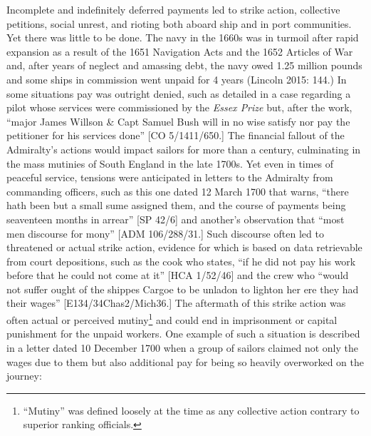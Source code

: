 \documentclass[12pt]{article}
\newenvironment{styleStandard}{\renewcommand\baselinestretch{1.0}\setlength\leftskip{0cm}\setlength\rightskip{0cm plus 1fil}\setlength\parindent{0cm}\setlength\parfillskip{0pt plus 1fil}\setlength\parskip{0in plus 1pt}\writerlistparindent\writerlistleftskip\leavevmode\normalfont\normalsize\writerlistlabel\ignorespaces}{\unskip\vspace{0in plus 1pt}\par}
\newcommand\writerlistleftskip{}
\newcommand\writerlistparindent{}
\newcommand\writerlistlabel{}
\begin{document}
\begin{styleStandard}
Incomplete and indefinitely deferred payments led to strike action, collective petitions, social unrest, and rioting both aboard ship and in port communities. Yet there was little to be done. The navy in the 1660s was in turmoil after rapid expansion as a result of the 1651 Navigation Acts and the 1652 Articles of War and, after years of neglect and amassing debt, the navy owed 1.25 million pounds and some ships in commission went unpaid for 4 years (Lincoln 2015: 144.) In some situations pay was outright denied, such as detailed in a case regarding a pilot whose services were commissioned by the \textit{Essex Prize} but, after the work, “major James Willson \& Capt Samuel Bush will in no wise satisfy nor pay the petitioner for his services done” [CO 5/1411/650.] The financial fallout of the Admiralty’s actions would impact sailors for more than a century, culminating in the mass mutinies of South England in the late 1700s. Yet even in times of peaceful service, tensions were anticipated in letters to the Admiralty from commanding officers, such as this one dated 12 March 1700 that warns, “there hath been but a small sume assigned them, and the course of payments being seaventeen months in arrear” [SP 42/6] and another’s observation that “most men discourse for mony” [ADM 106/288/31.] Such discourse often led to threatened or actual strike action, evidence for which is based on data retrievable from court depositions, such as the cook who states, “if he did not pay his work before that he could not come at it” [HCA 1/52/46] and the crew who “would not suffer ought of the shippes Cargoe to be unladon to lighton her ere they had their wages” [E134/34Chas2/Mich36.] The aftermath of this strike action was often actual or perceived mutiny\footnote{ “Mutiny” was defined loosely at the time as any collective action contrary to superior ranking officials.} and could end in imprisonment or capital punishment for the unpaid workers. One example of such a situation is described in a letter dated 10 December 1700 when a group of sailors claimed not only the wages due to them but also additional pay for being so heavily overworked on the journey:
\end{styleStandard}
\end{document}
